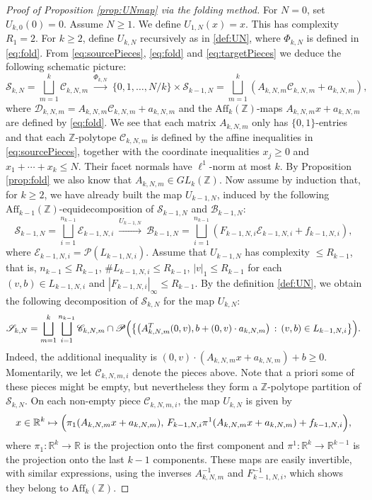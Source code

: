 \documentclass[a4paper,reqno,12pt]{amsart}
\theoremstyle{plain}
\theoremstyle{plain}
\theoremstyle{remark}
\theoremstyle{plain}
\newcommand{\B}{\mathscr{B}}
\newcommand{\C}{\mathscr{C}}
\newcommand{\D}{\mathscr{D}}
\newcommand{\E}{\mathscr{E}}
\newcommand{\cP}{\mathscr{P}}
\newcommand{\cS}{\mathscr{S}}
\newcommand{\RR}{\mathbb{R}}
\newcommand{\aff}{\text{Aff}}
\newcommand{\Z}{\mathbb{Z}}
\theoremstyle{plain}
\theoremstyle{plain}
\begin{document}
{\begin{proof}[Proof of Proposition \ref{prop:UNmap} via the folding method]
{For $N=0$, set $U_{k,0}(0)=0$. Assume $N\geq1$. We define $U_{1,N}(x)=x$. This has complexity $R_1=2$.} {For $k\geq2$, define} $U_{k,N}$ recursively as in \eqref{def:UN}, where $\Phi_{k,N}$ is defined in \eqref{eq:fold}. From \eqref{eq:sourcePieces}, \eqref{eq:fold} and \eqref{eq:targetPieces} we deduce the following schematic picture:
\[
\cS_{k,N} = \bigsqcup_{m=1}^{k} \C_{k,N,m} \ \xrightarrow{{\Phi_{k,N}}} \ \{0,1,\ldots,N/k\} \times \cS_{k-1,N} = \bigsqcup_{m=1}^{{k}} (A_{k,N,m}  \C_{k,N,m} + a_{k,N,m} ),
\]
where $\D_{k,N,m}={A_{k,N,m}  \C_{k,N,m} + a_{k,N,m}}$ and the $\aff_k(\Z)$-maps ${A_{k,N,m} x + a_{k,N,m}}$ are {defined} by \eqref{eq:fold}. We see that each matrix ${A_{k,N,m}}$ only has $\{0,1\}$-{entries} and that each $\Z$-polytope ${\C_{k,N,m}}$ is defined by {the affine inequalities in \eqref{eq:sourcePieces}, together with the coordinate inequalities $x_j\geq0$ and $x_1+\cdots+x_k\leq N$. Their facet normals have $\ell^1$-norm at most $k$.} By Proposition \ref{prop:fold} we also know that ${A_{k,N,m}} \in GL_{k}(\Z)$. Now assume by induction that, for $k\geq 2$, we have already {built} the map $U_{k-1,N}$, induced by the following $\aff_{k-1}(\Z)$-equidecomposition of $\cS_{k-1,N}$ and $\B_{k-1,N}$:
\[
\cS_{k-1,N} = \bigsqcup_{i=1}^{n_{k-1}} \E_{k-1,N,i} \ \xrightarrow{U_{k-1,N}} \ \B_{k-1,N} = \bigsqcup_{i=1}^{n_{k-1}} (F_{k-1,N,i}  \E_{k-1,N,i} + f_{k-1,N,i} ),
\]
{where $\E_{k-1,N,i}=\cP(L_{k-1,N,i})$.}
Assume that $U_{k-1,N}$ has complexity $ \leq R_{k-1}$, that is, $n_{k-1}\leq R_{k-1}$, {$\#L_{k-1,N,i}\leq R_{k-1}$,} {$|v|_1 \leq R_{k-1}$} for each  $(v,b) \in {L_{k-1,N,i}}$ and ${|F_{k-1,N,i}|_{\infty}} \leq R_{k-1}$. By the definition \eqref{def:UN}, we obtain the following decomposition of $\cS_{k,N}$ for the map $U_{k,N}$:
\[
 \cS_{k,N} = \bigsqcup_{m=1}^{k} \bigsqcup_{i=1}^{n_{k-1}} \C_{k,N,m} \cap \cP\Bigl(\big\{ \big(A_{k,N,m}^T (0,v),{b+(0,v)\cdot a_{k,N,m}}\big) \, : \, (v,b) \in L_{k-1,N,i}\big\}\Bigr).
\]
{Indeed, the additional inequality is $(0,v)\cdot(A_{k,N,m}x+a_{k,N,m})+b\geq0$.}
Momentarily, we let $\C_{k,N,m,i}$ denote the pieces above. Note that {a priori} some of these pieces might be empty, but nevertheless they form a $\Z$-polytope partition of $\cS_{k,N}$. On each non-empty piece $\C_{k,N,m,i}$, the map $U_{k,N}$ is given by
\[
x\in\RR^k\mapsto
\Bigl(\pi_1(A_{k,N,m}x+a_{k,N,m}),\,
F_{k-1,N,i}\pi^1(A_{k,N,m}x+a_{k,N,m})+f_{k-1,N,i}\Bigr),
\]
where $\pi_1:\RR^k \to \RR$ is the projection {onto} the first component and $\pi^1:\RR^k \to \RR^{k-1}$ is {the} projection {onto} the last $k-1$ components. These maps are easily invertible, with similar expressions, using the inverses $A_{k,N,m}^{-1}$ and $F_{k-1,N,i}^{-1}$, which shows they belong to $\aff_k(\Z)$.

\end{proof}}
\end{document}
